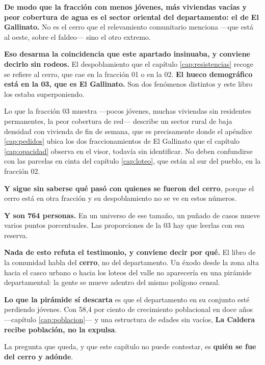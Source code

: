 \begin{cautela}
\textbf{De modo que la fracción con menos jóvenes, más viviendas vacías y peor cobertura de agua
es el sector oriental del departamento: el de El Gallinato.} No es el cerro que el relevamiento
comunitario menciona ---que está al oeste, sobre el faldeo--- sino el otro extremo.

\textbf{Eso desarma la coincidencia que este apartado insinuaba, y conviene decirlo sin
rodeos.} El despoblamiento que el capítulo \ref{cap:resistencias} recoge se refiere al cerro,
que cae en la fracción 01 o en la 02. \textbf{El hueco demográfico está en la 03, que es El
Gallinato.} Son dos fenómenos distintos y este libro los estaba superponiendo.

Lo que la fracción 03 muestra ---pocos jóvenes, muchas viviendas sin residentes permanentes, la
peor cobertura de red--- describe un sector rural de baja densidad con vivienda de fin de
semana, que es precisamente donde el apéndice \ref{cap:pedidos} ubica los dos fraccionamientos de El Gallinato que el capítulo \ref{cap:opacidad} observa en el visor, todavía sin identificar. No deben confundirse con las parcelas en cinta del capítulo \ref{cap:loteo}, que están al sur del pueblo, en la fracción 02.

\textbf{Y sigue sin saberse qué pasó con quienes se fueron del cerro}, porque el cerro está en
otra fracción y su despoblamiento no se ve en estos números.

\textbf{Y son 764 personas.} En un universo de ese tamaño, un puñado de casos mueve varios
puntos porcentuales. Las proporciones de la 03 hay que leerlas con esa reserva.
\end{cautela}

\begin{cautela}
\textbf{Nada de esto refuta el testimonio, y conviene decir por qué.} El libro de la comunidad habla del
\textbf{cerro}, no del departamento. Un éxodo desde la zona alta hacia el casco urbano o hacia
los loteos del valle no aparecería en una pirámide departamental: la gente se mueve adentro del
mismo polígono censal.

\textbf{Lo que la pirámide sí descarta} es que el departamento en su conjunto esté perdiendo
jóvenes. Con 58,4 por ciento de crecimiento poblacional en doce años ---capítulo
\ref{cap:poblacion}--- y una estructura de edades sin vacíos, \textbf{La Caldera recibe
población, no la expulsa}.

La pregunta que queda, y que este capítulo no puede contestar, es \textbf{quién se fue del cerro
y adónde}.
\end{cautela}

